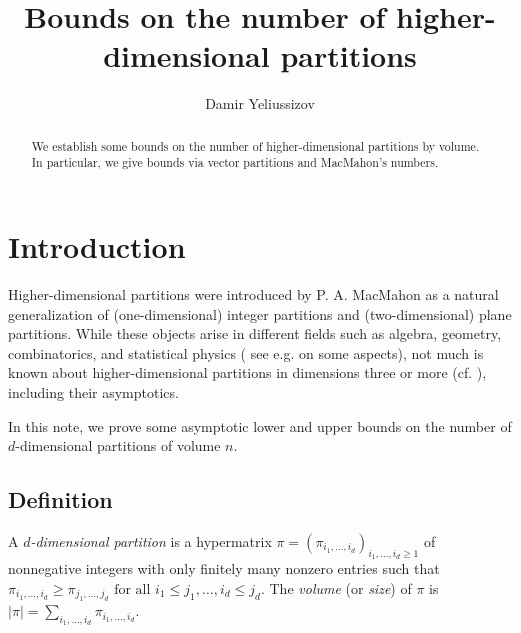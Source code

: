 \documentclass[12pt]{amsart}
\title[Bounds on the number of higher-dimensional partitions]{Bounds on the number of higher-dimensional partitions}
\author[Damir Yeliussizov]{Damir Yeliussizov}
\theoremstyle{definition}
\theoremstyle{remark}
\begin{document}
\begin{abstract}
We establish some bounds on the number of higher-dimensional partitions by volume. 
In particular, we give bounds via vector partitions and MacMahon's numbers. %
\end{abstract}

\maketitle


\section{Introduction}

{Higher-dimensional partitions} were introduced by P. A. MacMahon \cite{macmahon} as a natural generalization of  
(one-dimensional) 
integer partitions and (two-dimensional) 
plane partitions. %
While these  objects %
arise in different 
fields such as %
algebra, geometry, combinatorics,  and statistical physics 
(%
see e.g. 
\cite{mr, bgp, bbs, gov, ms, nekrasov} on some aspects), %
not much is known about 
higher-dimensional partitions 
in dimensions three or more (cf. \cite[]{sta}), including %
their asymptotics. %


\vspace{0.5em}

In this note, we prove some asymptotic lower and upper bounds on the number of $d$-dimensional partitions of volume $n$.


\subsection{Definition} %
A {\it $d$-dimensional partition} is a hypermatrix 
$\pi = (\pi_{i_1,\ldots, i_d})_{i_1,\ldots, i_d \ge 1}$ of nonnegative integers with only finitely many nonzero entries such that %
$
\pi_{i_1,\ldots, i_d} \ge \pi_{j_1,\ldots, j_d} \text{ for all } i_1 \le j_1, \ldots, i_d \le j_d.
$
The {\it volume} (or {\it size}) of $\pi$ is $|\pi| = \sum_{i_1,\ldots, i_d} \pi_{i_1,\ldots, i_d}.$ 
\end{document}
